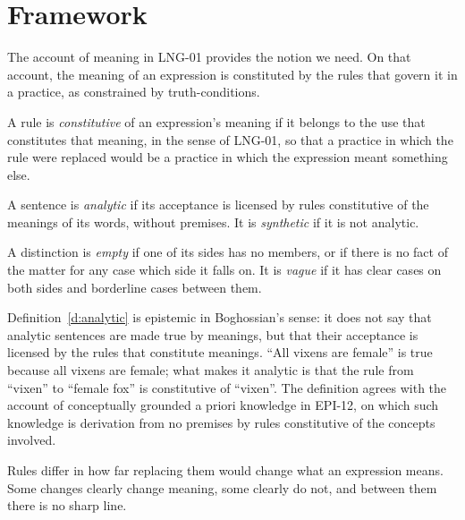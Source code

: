 \documentclass{situationist-preprint}
\begin{document}
\section{Framework}

The account of meaning in LNG-01 provides the notion we need. On that account, the meaning of an expression is constituted by the rules that govern it in a practice, as constrained by truth-conditions.

\begin{definition}\label{d:const}
A rule is \emph{constitutive} of an expression's meaning if it belongs to the use that constitutes that meaning, in the sense of LNG-01, so that a practice in which the rule were replaced would be a practice in which the expression meant something else.
\end{definition}

\begin{definition}[Analytic]\label{d:analytic}
A sentence is \emph{analytic} if its acceptance is licensed by rules constitutive of the meanings of its words, without premises. It is \emph{synthetic} if it is not analytic.
\end{definition}

\begin{definition}\label{d:vague}
A distinction is \emph{empty} if one of its sides has no members, or if there is no fact of the matter for any case which side it falls on. It is \emph{vague} if it has clear cases on both sides and borderline cases between them.
\end{definition}

Definition~\ref{d:analytic} is epistemic in Boghossian's sense: it does not say that analytic sentences are made true by meanings, but that their acceptance is licensed by the rules that constitute meanings. \enquote{All vixens are female} is true because all vixens are female; what makes it analytic is that the rule from \enquote{vixen} to \enquote{female fox} is constitutive of \enquote{vixen}. The definition agrees with the account of conceptually grounded a priori knowledge in EPI-12, on which such knowledge is derivation from no premises by rules constitutive of the concepts involved.

\begin{principle}\label{p:graded}
Rules differ in how far replacing them would change what an expression means. Some changes clearly change meaning, some clearly do not, and between them there is no sharp line.
\end{principle}
\end{document}
